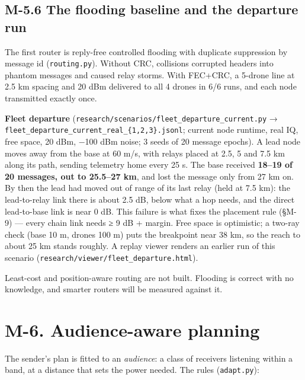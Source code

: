 \documentclass[10pt,letterpaper,twocolumn]{article}
\begin{document}
\subsection{M-5.6 The flooding baseline and the departure run}\label{m-56-the-flooding-baseline-and-the-departure-run}

The first router is reply-free controlled flooding with duplicate suppression by message id (\texttt{routing.\allowbreak{}py}). Without CRC, collisions corrupted headers into phantom messages and caused relay storms. With FEC+CRC, a 5-drone line at 2.5 km spacing and 20 dBm delivered to all 4 drones in 6/6 runs, and each node transmitted exactly once.

\textbf{Fleet departure} (\texttt{research/\allowbreak{}scenarios/\allowbreak{}fleet\_\allowbreak{}departure\_\allowbreak{}current.\allowbreak{}py} → \texttt{fleet\_\allowbreak{}departure\_\allowbreak{}current\_\allowbreak{}real\_\allowbreak{}\{1,\allowbreak{}2,\allowbreak{}3\}.\allowbreak{}jsonl}; current node runtime, real IQ, free space, 20 dBm, −100 dBm noise; 3 seeds of 20 message epochs). A lead node moves away from the base at 60 m/s, with relays placed at 2.5, 5 and 7.5 km along its path, sending telemetry home every 25 s. The base received \textbf{18--19 of 20 messages, out to 25.5--27 km}, and lost the message only from 27 km on. By then the lead had moved out of range of its last relay (held at 7.5 km): the lead-to-relay link there is about 2.5 dB, below what a hop needs, and the direct lead-to-base link is near 0 dB. This failure is what fixes the placement rule (§M-9) --- every chain link needs ≥ 9 dB + margin. Free space is optimistic; a two-ray check (base 10 m, drones 100 m) puts the breakpoint near 38 km, so the reach to about 25 km stands roughly. A replay viewer renders an earlier run of this scenario (\texttt{research/\allowbreak{}viewer/\allowbreak{}fleet\_\allowbreak{}departure.\allowbreak{}html}).

Least-cost and position-aware routing are not built. Flooding is correct with no knowledge, and smarter routers will be measured against it.

\section{M-6. Audience-aware planning}\label{m-6-audience-aware-planning}

The sender's plan is fitted to an \emph{audience}: a class of receivers listening within a band, at a distance that sets the power needed. The rules (\texttt{adapt.\allowbreak{}py}):
\end{document}
